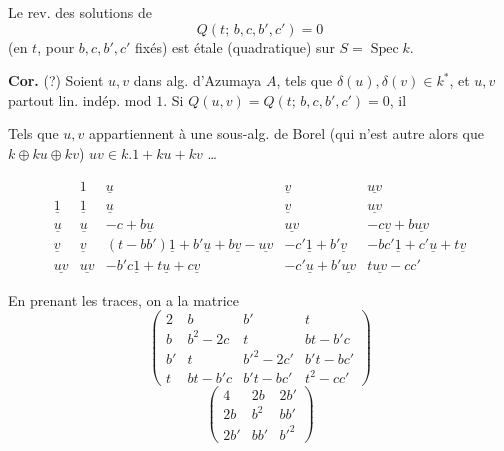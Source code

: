 \documentclass[11pt,a4paper]{article}
\begin{document}
\struck{\ill{}} Le rev. des solutions de
\[
Q(t;\, b, c, b', c') = 0
\]
(en $t$, pour $b, c, b', c'$ fixés) est étale (quadratique) sur $S = \operatorname{Spec} k$.

\textbf{Cor.} (?) Soient $u, v$ dans  alg. d'Azumaya $A$, tels que $\delta(u), \delta(v) \in k^*$,  et $u, v$ partout lin. indép. mod $1$.  Si $Q(u, v) = Q(t;\, b, c, b', c') = 0$,  il

 Tels que $u, v$ appartiennent à une
\struck{\ill{}} sous-alg. de Borel (qui n'est autre alors que $k \oplus ku \oplus kv$) \struck{\ill{}} $uv \in k.1 + ku + kv$ \ldots

\[
\begin{array}{c|c|cccc}
 & 1 & \underline{u} & \underline{v} & \underline{uv}\\ \hline
\underline{1} & \underline{1} & \underline{u} & \underline{v} & \underline{uv}\\
\underline{u} & \underline{u} & -c + b\underline{u} & \underline{uv} & -c\underline{v} + b\underline{uv}\\
\underline{v} & \underline{v} & (t - bb')\underline{1} + b'\underline{u} + b\underline{v} - \underline{uv} & -c'\underline{1} + b'\underline{v} & -bc'\underline{1} + c'\underline{u} + t\underline{v}\\
\underline{uv} & \underline{uv} & -b'c\underline{1} + t\underline{u} + c\underline{v} & -c'\underline{u} + b'\underline{uv} & t\underline{uv} - cc'
\end{array}
\]

En prenant les traces, on a la matrice
\[
\begin{pmatrix}
2 & b & b' & t\\
b & b^2 - 2c & t & bt - b'c\\
b' & t & b'^2 - 2c' & b't - bc'\\
t & bt - b'c & b't - bc' & t^2 - cc'
\end{pmatrix}
\]
\[
\begin{pmatrix}
4 & 2b & 2b'\\
2b & b^2 & bb'\\
2b' & bb' & b'^2
\end{pmatrix}
\]
\end{document}
